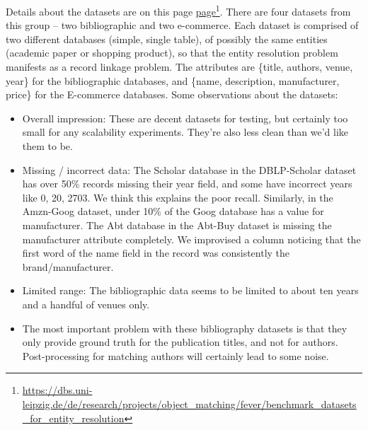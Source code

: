 \documentclass{article}
\begin{document}
Details about the datasets are on this page \href{https://dbs.uni-leipzig.de/de/research/projects/object_matching/fever/benchmark_datasets_for_entity_resolution}{page}\footnote{\url{https://dbs.uni-leipzig.de/de/research/projects/object_matching/fever/benchmark_datasets_for_entity_resolution}}. There are four datasets from this group -- two bibliographic and two e-commerce. Each dataset is comprised of two different databases (simple, single table), of possibly the same entities (academic paper or shopping product), so that the entity resolution problem manifests as a record linkage problem. The attributes are \{title, authors, venue, year\} for the bibliographic databases, and \{name, description, manufacturer, price\} for the E-commerce databases. Some observations about the datasets:
\begin{itemize}
    \item Overall impression: These are decent datasets for testing, but certainly too small for any scalability experiments. They're also less clean than we'd like them to be.
    \item Missing / incorrect data: The Scholar database in the DBLP-Scholar dataset has over 50\% records missing their year field, and some have incorrect years like 0, 20, 2703. We think this explains the poor recall. Similarly, in the Amzn-Goog dataset, under 10\% of the Goog database has a value for manufacturer. The Abt database in the Abt-Buy dataset is missing the manufacturer attribute completely. We improvised a column noticing that the first word of the name field in the record was consistently the brand/manufacturer.
    \item Limited range: The bibliographic data seems to be limited to about ten years and a handful of venues only.
    \item The most important problem with these bibliography datasets is that they only provide ground truth for the publication titles, and not for authors. Post-processing for matching authors will certainly lead to some noise.
\end{itemize}
\end{document}
